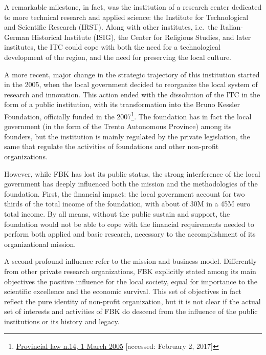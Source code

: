 A remarkable milestone, in fact, was the institution of a research center dedicated to more technical research and applied science: the Institute for Technological and Scientific Research (IRST). Along with other institutes, i.e.\ the Italian-German Historical Institute (ISIG), the Center for Religious Studies, and later institutes, the ITC could cope with both the need for a technological development of the region, and the need for preserving the local culture. 

A more recent, major change in the strategic trajectory of this institution started in the 2005, when the local government decided to reorganize the local system of research and innovation. This action ended with the dissolution of the ITC in the form of a public institution, with its transformation into the Bruno Kessler Foundation, officially funded in the 2007\footnote{
	\href{http://www.consiglio.provincia.tn.it/leggi-e-archivi/codice-provinciale/archivio/Pages/Legge\%20provinciale\%202\%20agosto\%202005,\%20n.\%2014_12567.aspx?zid=6003d625-228e-4e5d-820d-d6cf459dfc36}
	{Provincial law n.14, 1 March 2005}
	[accessed: February 2, 2017]
}. The foundation has in fact the local government (in the form of the Trento Autonomous Province) among its founders, but the institution is mainly regulated by the private legislation, the same that regulate the activities of foundations and other non-profit organizations. 

However, while FBK has lost its public status, the strong interference of the local government has deeply influenced both the mission and the methodologies of the foundation. First, the financial impact: the local government account for two thirds of the total income of the foundation, with about of 30M in a 45M euro total income. By all means, without the public sustain and support, the foundation would not be able to cope with the financial requirements needed to perform both applied and basic research, necessary to the accomplishment of its organizational mission.

A second profound influence refer to the mission and business model. Differently from other private research organizations, FBK explicitly stated among its main objectives the positive influence for the local society, equal for importance to the scientific excellence and the economic survival. This set of objectives in fact reflect the pure identity of non-profit organization, but it is not clear if the actual set of interests and activities of FBK do descend from the influence of the public institutions or its history and legacy.

